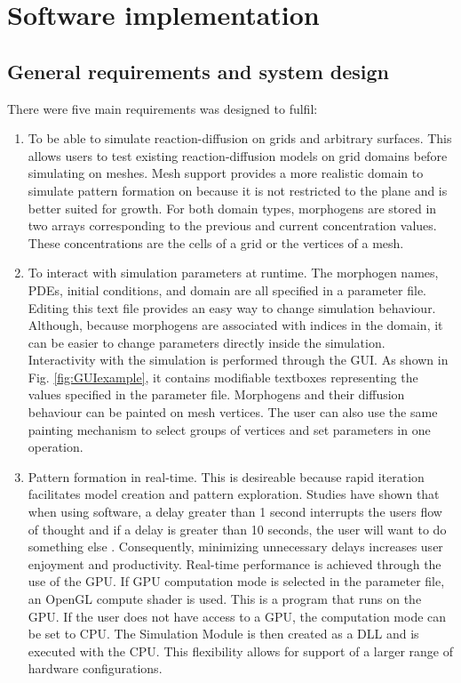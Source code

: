 \chapter{Software implementation}

\section{General requirements and system design}
There were five main requirements \ProgramName{} was designed to fulfil:

\begin{enumerate}
	\item To be able to simulate reaction-diffusion on grids and arbitrary surfaces. This allows users to test existing reaction-diffusion models on grid domains before simulating on meshes. Mesh support provides a more realistic domain to simulate pattern formation on because it is not restricted to the plane and is better suited for growth. For both domain types, morphogens are stored in two arrays corresponding to the previous and current concentration values. These concentrations are the cells of a grid or the vertices of a mesh. 
	
	\item To interact with simulation parameters at runtime. The morphogen names, PDEs, initial conditions, and domain are all specified in a parameter file. Editing this text file provides an easy way to change simulation behaviour. Although, because morphogens are associated with indices in the domain, it can be easier to change parameters directly inside the simulation. Interactivity with the simulation is performed through the GUI. As shown in Fig. \ref{fig:GUIexample}, it contains modifiable textboxes representing the values specified in the parameter file. Morphogens and their diffusion behaviour can be painted on mesh vertices. The user can also use the same painting mechanism to select groups of vertices and set parameters in one operation. 

	\item Pattern formation in real-time. This is desireable because rapid iteration facilitates model creation and pattern exploration. Studies have shown that when using software, a delay greater than 1 second interrupts the users flow of thought and if a delay is greater than 10 seconds, the user will want to do something else \citep{nielsen1994}. Consequently, minimizing unnecessary delays increases user enjoyment and productivity. Real-time performance is achieved through the use of the GPU. If GPU computation mode is selected in the parameter file, an OpenGL compute shader is used. This is a program that runs on the GPU. If the user does not have access to a GPU, the computation mode can be set to CPU. The Simulation Module is then created as a DLL and is executed with the CPU. This flexibility allows for support of a larger range of hardware configurations. 
	

\end{enumerate}

